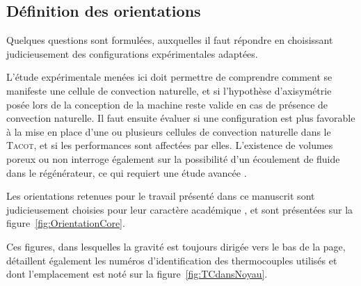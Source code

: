 \subsection{Définition des orientations}
Quelques questions sont formulées, auxquelles il faut répondre en choisissant judicieusement des configurations expérimentales adaptées. 

L'étude expérimentale menées ici doit permettre de comprendre comment se manifeste une cellule de convection naturelle, et si l'hypothèse d'axisymétrie posée lors de la conception de la machine reste valide en cas de présence de convection naturelle. Il faut ensuite évaluer si une configuration est plus favorable à la mise en place d'une ou plusieurs cellules de convection naturelle dans le \textsc{Tacot}, et si les performances sont affectées par elles. L'existence de volumes poreux ou non interroge également sur la possibilité d'un écoulement de fluide dans le régénérateur, ce qui requiert une étude avancée .\medskip 

Les orientations retenues pour le travail présenté dans ce manuscrit sont judicieusement choisies pour leur caractère académique , et sont présentées sur la figure~\ref{fig:OrientationCore}.

Ces figures, dans lesquelles la gravité est toujours dirigée vers le bas de la page, détaillent également les numéros d'identification des thermocouples utilisés et dont l'emplacement est noté sur la figure~\ref{fig:TCdansNoyau}.\medskip

